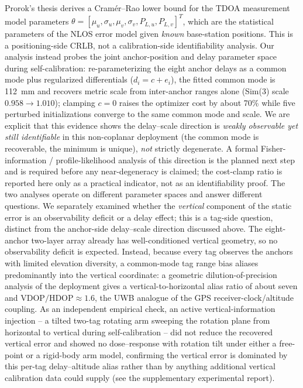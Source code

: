 \documentclass[11pt,a4paper]{article}
\begin{document}
Prorok's thesis \citep{prorok_2013_models_algorithms_uwb_localization_thesis}
derives a Cram\'{e}r--Rao lower bound for the TDOA measurement model parameters
$\theta = [\mu_u, \sigma_u, \mu_v, \sigma_v, P_{L,u}, P_{L,v}]^T$, which are the
statistical parameters of the NLOS error model given \emph{known} base-station
positions. This is a positioning-side CRLB, not a calibration-side identifiability
analysis. Our analysis instead probes the joint anchor-position and delay parameter
space during self-calibration: re-parameterizing the eight anchor delays as a common
mode plus regularized differentials ($d_i = c + e_i$), the fitted common mode is
112~mm and recovers metric scale from inter-anchor ranges alone
(Sim(3) scale $0.958 \to 1.010$); clamping $c = 0$ raises the optimizer cost by
about 70\% while five perturbed initializations converge to the same common mode
and scale. We are explicit that this evidence shows the delay--scale direction is
\emph{weakly observable yet still identifiable} in this non-coplanar deployment
(the common mode is recoverable, the minimum is unique), \emph{not} strictly
degenerate. A formal Fisher-information / profile-likelihood analysis of this
direction is the planned next step and is required before any near-degeneracy is
claimed; the cost-clamp ratio is reported here only as a practical indicator, not as
an identifiability proof. The two analyses operate on different parameter spaces and
answer different questions. We separately examined whether the \emph{vertical}
component of the static error is an observability deficit or a delay effect; this
is a tag-side question, distinct from the anchor-side delay--scale direction
discussed above. The eight-anchor two-layer array already has well-conditioned
vertical geometry, so no observability deficit is expected. Instead, because every
tag observes the anchors with limited elevation diversity, a common-mode tag range
bias aliases predominantly into the vertical coordinate: a geometric
dilution-of-precision analysis of the deployment gives a vertical-to-horizontal
alias ratio of about seven and $\mathrm{VDOP}/\mathrm{HDOP}\approx1.6$, the UWB
analogue of the GPS receiver-clock/altitude coupling. As an independent empirical
check, an active vertical-information injection -- a tilted two-tag rotating arm
sweeping the rotation plane from horizontal to vertical during self-calibration --
did not reduce the recovered vertical error and showed no dose--response with
rotation tilt under either a free-point or a rigid-body arm model, confirming the
vertical error is dominated by this per-tag delay--altitude alias rather than by
anything additional vertical calibration data could supply (see the supplementary
experimental report).
\end{document}
